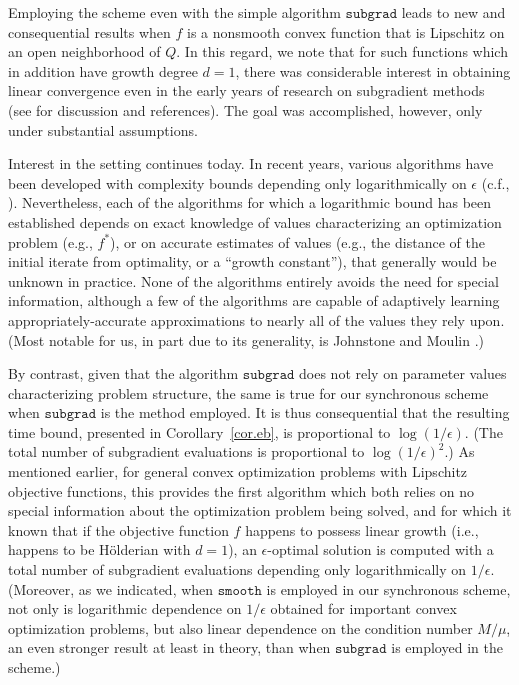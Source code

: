 \documentclass[reqno, 11pt]{amsart}
\numberwithin{equation}{section}
\newcommand{\subgrad}{\mathtt{subgrad}}
\newcommand{\smooth}{\mathtt{smooth}}
\begin{document}
Employing the scheme even with the simple algorithm $ \subgrad $  leads to new and consequential results when $ f $ is a nonsmooth convex function that is Lipschitz  on an open neighborhood of $ Q $. In this regard, we note that for such functions which in addition have growth degree $ d = 1 $, there was considerable interest in obtaining linear convergence even in the early years of research on subgradient methods
 (see \cite{polyak1963gradient,polyak1977subgradient,goffin1977convergence,shor1985minimization} for discussion and references). The goal was accomplished, however, only under substantial assumptions.
 
 Interest in the setting continues today. In recent years, various algorithms have been developed with complexity bounds depending only logarithmically on $ \epsilon $  (c.f., \cite{bolte2017error,gilpin2010first,johnstone2020faster,renegar2016efficient,yang2018rsg}). 
Nevertheless, each of the algorithms for which a logarithmic bound has been established depends on exact knowledge of values characterizing an optimization problem (e.g., $ f^* $), or on accurate estimates of values (e.g., the distance of the initial iterate from optimality, or a ``growth constant''), that generally would be unknown in practice. None of the algorithms entirely avoids the need for special information, although a few of the algorithms are capable of adaptively learning appropriately-accurate approximations to nearly all of the values they rely upon. (Most notable for us, in part due to its generality, is Johnstone and Moulin \cite{johnstone2020faster}.)  

By contrast, given that the algorithm $ \subgrad $ does not rely on parameter values characterizing problem structure, the same is true for our synchronous scheme when $ \subgrad $ is the method employed. It is thus consequential that the resulting time bound, presented in Corollary~\ref{cor.eb}, is proportional to $ \log (1/\epsilon) $. (The total number of subgradient evaluations is proportional to $ \log(1/\epsilon)^2 $.) As mentioned earlier, for general convex optimization problems with Lipschitz objective functions, this provides the first algorithm which both relies on no special information about the optimization problem being solved, and for which it known that if the objective function $ f $ happens to possess linear growth (i.e., happens to be H\"{o}lderian with $ d = 1 $), an $ \epsilon $-optimal solution is computed with a total number of subgradient evaluations depending only logarithmically on $ 1/\epsilon $. (Moreover, as we indicated, when $ \smooth $ is employed in our synchronous scheme, not only is logarithmic dependence on $ 1/\epsilon $ obtained for important convex optimization problems, but also linear dependence on the condition number $ M/\mu $, an even stronger result at least in theory, than when $ \subgrad $ is employed in the scheme.)
\end{document}
